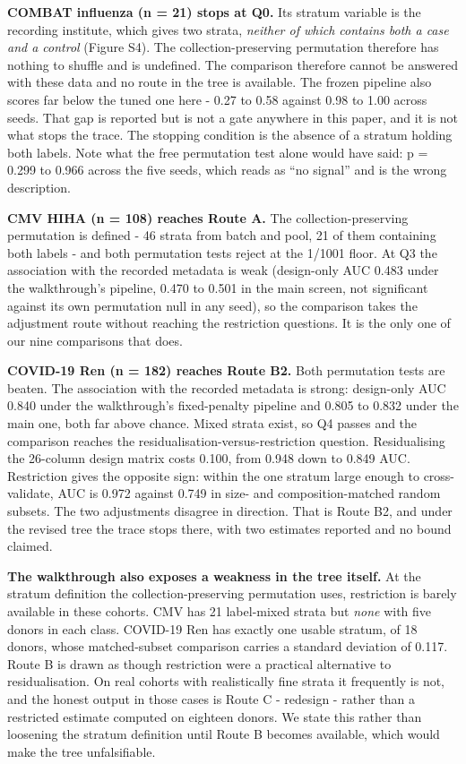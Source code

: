 \textbf{COMBAT influenza (n = 21) stops at Q0.} Its stratum variable is the recording institute, which gives two strata, \emph{neither of which contains both a case and a control} (Figure S4). The collection-preserving permutation therefore has nothing to shuffle and is undefined. The comparison therefore cannot be answered with these data and no route in the tree is available. The frozen pipeline also scores far below the tuned one here - 0.27 to 0.58 against 0.98 to 1.00 across seeds. That gap is reported but is not a gate anywhere in this paper, and it is not what stops the trace. The stopping condition is the absence of a stratum holding both labels. Note what the free permutation test alone would have said: p = 0.299 to 0.966 across the five seeds, which reads as ``no signal'' and is the wrong description.

\textbf{CMV HIHA (n = 108) reaches Route A.} The collection-preserving permutation is defined - 46 strata from batch and pool, 21 of them containing both labels - and both permutation tests reject at the 1/1001 floor. At Q3 the association with the recorded metadata is weak (design-only AUC 0.483 under the walkthrough's pipeline, 0.470 to 0.501 in the main screen, not significant against its own permutation null in any seed), so the comparison takes the adjustment route without reaching the restriction questions. It is the only one of our nine comparisons that does.

\textbf{COVID-19 Ren (n = 182) reaches Route B2.} Both permutation tests are beaten. The association with the recorded metadata is strong: design-only AUC 0.840 under the walkthrough's fixed-penalty pipeline and 0.805 to 0.832 under the main one, both far above chance. Mixed strata exist, so Q4 passes and the comparison reaches the residualisation-versus-restriction question. Residualising the 26-column design matrix costs 0.100, from 0.948 down to 0.849 AUC. Restriction gives the opposite sign: within the one stratum large enough to cross-validate, AUC is 0.972 against 0.749 in size- and composition-matched random subsets. The two adjustments disagree in direction. That is Route B2, and under the revised tree the trace stops there, with two estimates reported and no bound claimed.

\textbf{The walkthrough also exposes a weakness in the tree itself.} At the stratum definition the collection-preserving permutation uses, restriction is barely available in these cohorts. CMV has 21 label-mixed strata but \emph{none} with five donors in each class. COVID-19 Ren has exactly one usable stratum, of 18 donors, whose matched-subset comparison carries a standard deviation of 0.117. Route B is drawn as though restriction were a practical alternative to residualisation. On real cohorts with realistically fine strata it frequently is not, and the honest output in those cases is Route C - redesign - rather than a restricted estimate computed on eighteen donors. We state this rather than loosening the stratum definition until Route B becomes available, which would make the tree unfalsifiable.

